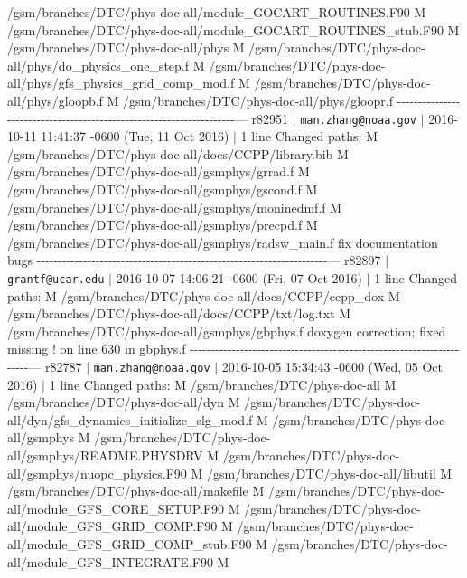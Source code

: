 \begin{DoxyItemize}
/gsm/branches/\+D\+T\+C/phys-\/doc-\/all/module\+\_\+\+G\+O\+C\+A\+R\+T\+\_\+\+R\+O\+U\+T\+I\+N\+ES.F90 M /gsm/branches/\+D\+T\+C/phys-\/doc-\/all/module\+\_\+\+G\+O\+C\+A\+R\+T\+\_\+\+R\+O\+U\+T\+I\+N\+E\+S\+\_\+stub.F90 M /gsm/branches/\+D\+T\+C/phys-\/doc-\/all/phys M /gsm/branches/\+D\+T\+C/phys-\/doc-\/all/phys/do\+\_\+physics\+\_\+one\+\_\+step.f M /gsm/branches/\+D\+T\+C/phys-\/doc-\/all/phys/gfs\+\_\+physics\+\_\+grid\+\_\+comp\+\_\+mod.f M /gsm/branches/\+D\+T\+C/phys-\/doc-\/all/phys/gloopb.f M /gsm/branches/\+D\+T\+C/phys-\/doc-\/all/phys/gloopr.f -\/-\/-\/-\/-\/-\/-\/-\/-\/-\/-\/-\/-\/-\/-\/-\/-\/-\/-\/-\/-\/-\/-\/-\/-\/-\/-\/-\/-\/-\/-\/-\/-\/-\/-\/-\/-\/-\/-\/-\/-\/-\/-\/-\/-\/-\/-\/-\/-\/-\/-\/-\/-\/-\/-\/-\/-\/-\/-\/-\/-\/-\/-\/-\/-\/-\/-\/-\/-\/--- r82951 $\vert$ {\tt man.\+zhang@noaa.\+gov} $\vert$ 2016-\/10-\/11 11\+:41\+:37 -\/0600 (Tue, 11 Oct 2016) $\vert$ 1 line Changed paths\+: M /gsm/branches/\+D\+T\+C/phys-\/doc-\/all/docs/\+C\+C\+P\+P/library.bib M /gsm/branches/\+D\+T\+C/phys-\/doc-\/all/gsmphys/grrad.f M /gsm/branches/\+D\+T\+C/phys-\/doc-\/all/gsmphys/gscond.f M /gsm/branches/\+D\+T\+C/phys-\/doc-\/all/gsmphys/moninedmf.f M /gsm/branches/\+D\+T\+C/phys-\/doc-\/all/gsmphys/precpd.f M /gsm/branches/\+D\+T\+C/phys-\/doc-\/all/gsmphys/radsw\+\_\+main.f fix documentation bugs -\/-\/-\/-\/-\/-\/-\/-\/-\/-\/-\/-\/-\/-\/-\/-\/-\/-\/-\/-\/-\/-\/-\/-\/-\/-\/-\/-\/-\/-\/-\/-\/-\/-\/-\/-\/-\/-\/-\/-\/-\/-\/-\/-\/-\/-\/-\/-\/-\/-\/-\/-\/-\/-\/-\/-\/-\/-\/-\/-\/-\/-\/-\/-\/-\/-\/-\/-\/-\/--- r82897 $\vert$ {\tt grantf@ucar.\+edu} $\vert$ 2016-\/10-\/07 14\+:06\+:21 -\/0600 (Fri, 07 Oct 2016) $\vert$ 1 line Changed paths\+: M /gsm/branches/\+D\+T\+C/phys-\/doc-\/all/docs/\+C\+C\+P\+P/ccpp\+\_\+dox M /gsm/branches/\+D\+T\+C/phys-\/doc-\/all/docs/\+C\+C\+P\+P/txt/log.txt M /gsm/branches/\+D\+T\+C/phys-\/doc-\/all/gsmphys/gbphys.f doxygen correction; fixed missing ! on line 630 in gbphys.\+f -\/-\/-\/-\/-\/-\/-\/-\/-\/-\/-\/-\/-\/-\/-\/-\/-\/-\/-\/-\/-\/-\/-\/-\/-\/-\/-\/-\/-\/-\/-\/-\/-\/-\/-\/-\/-\/-\/-\/-\/-\/-\/-\/-\/-\/-\/-\/-\/-\/-\/-\/-\/-\/-\/-\/-\/-\/-\/-\/-\/-\/-\/-\/-\/-\/-\/-\/-\/-\/--- r82787 $\vert$ {\tt man.\+zhang@noaa.\+gov} $\vert$ 2016-\/10-\/05 15\+:34\+:43 -\/0600 (Wed, 05 Oct 2016) $\vert$ 1 line Changed paths\+: M /gsm/branches/\+D\+T\+C/phys-\/doc-\/all M /gsm/branches/\+D\+T\+C/phys-\/doc-\/all/dyn M /gsm/branches/\+D\+T\+C/phys-\/doc-\/all/dyn/gfs\+\_\+dynamics\+\_\+initialize\+\_\+slg\+\_\+mod.f M /gsm/branches/\+D\+T\+C/phys-\/doc-\/all/gsmphys M /gsm/branches/\+D\+T\+C/phys-\/doc-\/all/gsmphys/\+R\+E\+A\+D\+ME.P\+H\+Y\+S\+D\+RV M /gsm/branches/\+D\+T\+C/phys-\/doc-\/all/gsmphys/nuopc\+\_\+physics.F90 M /gsm/branches/\+D\+T\+C/phys-\/doc-\/all/libutil M /gsm/branches/\+D\+T\+C/phys-\/doc-\/all/makefile M /gsm/branches/\+D\+T\+C/phys-\/doc-\/all/module\+\_\+\+G\+F\+S\+\_\+\+C\+O\+R\+E\+\_\+\+S\+E\+T\+UP.F90 M /gsm/branches/\+D\+T\+C/phys-\/doc-\/all/module\+\_\+\+G\+F\+S\+\_\+\+G\+R\+I\+D\+\_\+\+C\+O\+MP.F90 M /gsm/branches/\+D\+T\+C/phys-\/doc-\/all/module\+\_\+\+G\+F\+S\+\_\+\+G\+R\+I\+D\+\_\+\+C\+O\+M\+P\+\_\+stub.F90 M /gsm/branches/\+D\+T\+C/phys-\/doc-\/all/module\+\_\+\+G\+F\+S\+\_\+\+I\+N\+T\+E\+G\+R\+A\+TE.F90 M 
\end{DoxyItemize}
